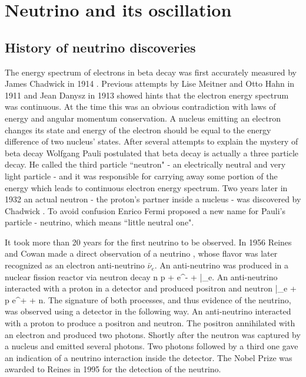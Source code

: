 \chapter{Neutrino and its oscillation}
\label{history_chapter}

\section{History of neutrino discoveries}
The energy spectrum of electrons in beta decay was first accurately measured by James Chadwick 
in 1914 \cite{chadwick}.  Previous attempts by Lise Meitner and Otto Hahn in 1911 and 
Jean Danysz in 1913 showed hints that the electron energy spectrum was continuous. 
At the time this was an obvious contradiction with laws of energy and angular momentum 
conservation. A nucleus emitting an electron changes its state and energy of the 
electron should be equal to the energy difference of two nucleus' states. After 
several attempts to explain the mystery of beta decay Wolfgang Pauli postulated 
\cite{pauli} that beta decay is actually a three particle decay. He called the third 
particle ``neutron" - an electrically neutral and very light particle - and it was 
responsible for carrying away some portion of the energy which leads to continuous 
electron energy spectrum. Two years later in 1932 an actual neutron - the proton's 
partner inside a nucleus - was discovered by Chadwick \cite{chadwick2}.  To avoid 
confusion Enrico Fermi proposed a new name for Pauli's particle \cite{fermi} - 
neutrino, which means ``little neutral one".

It took more than 20 years for the first neutrino to be observed.  In 1956 Reines 
and Cowan made a direct observation of a neutrino \cite{cowan}, whose flavor was 
later recognized as an electron anti-neutrino $\bar{\nu}_e$. An anti-neutrino was 
produced in a nuclear fission reactor via neutron decay
\be
n \rightarrow p + e^- + \bar{\nu}_e.
\ee
An anti-neutrino interacted with a proton in a detector and produced positron and neutron
\be
\bar{\nu}_e + p \rightarrow e^+ + n. 
\ee
The signature of both processes, and thus evidence of the neutrino, was observed using 
a detector in the following way. An anti-neutrino interacted with a proton to produce 
a positron and neutron.  The positron annihilated with an electron and produced two 
photons.  Shortly after the neutron was captured by a nucleus and emitted several photons.  
Two photons followed by a third one gave an indication of a neutrino interaction inside 
the detector. The Nobel Prize was awarded to Reines in 1995 for the detection of the neutrino.

